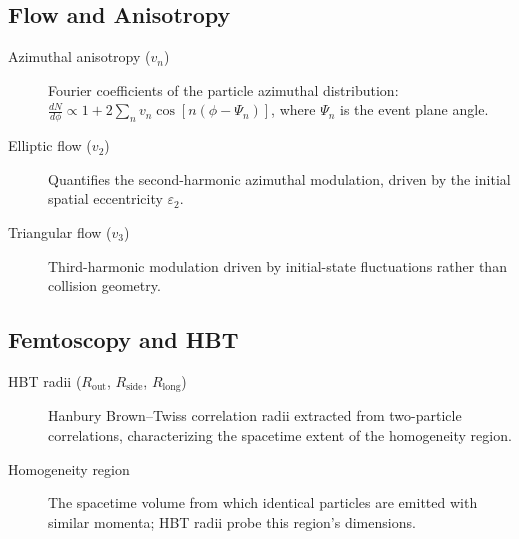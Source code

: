 \documentclass[11pt]{article}
\begin{document}
\subsection*{Flow and Anisotropy}

\begin{description}
\item[Azimuthal anisotropy ($v_n$)] Fourier coefficients of the particle azimuthal distribution: $\frac{dN}{d\phi} \propto 1 + 2\sum_n v_n \cos[n(\phi - \Psi_n)]$, where $\Psi_n$ is the event plane angle.

\item[Elliptic flow ($v_2$)] Quantifies the second-harmonic azimuthal modulation, driven by the initial spatial eccentricity $\varepsilon_2$.

\item[Triangular flow ($v_3$)] Third-harmonic modulation driven by initial-state fluctuations rather than collision geometry.
\end{description}

\subsection*{Femtoscopy and HBT}

\begin{description}
\item[HBT radii ($R_{\mathrm{out}}$, $R_{\mathrm{side}}$, $R_{\mathrm{long}}$)] Hanbury Brown--Twiss correlation radii extracted from two-particle correlations, characterizing the spacetime extent of the homogeneity region.

\item[Homogeneity region] The spacetime volume from which identical particles are emitted with similar momenta; HBT radii probe this region's dimensions.
\end{description}

\nocite{*}


\end{document}
